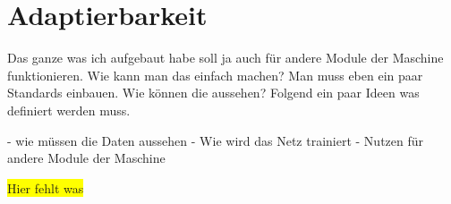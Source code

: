 \chapter{Adaptierbarkeit}
Das ganze was ich aufgebaut habe soll ja auch für andere Module der Maschine funktionieren. Wie kann man das einfach
machen? Man muss eben ein paar Standards einbauen. Wie können die aussehen? Folgend ein paar Ideen was definiert werden
muss.

- wie müssen die Daten aussehen
- Wie wird das Netz trainiert
- Nutzen für andere Module der Maschine

\colorbox{yellow}{Hier fehlt was}